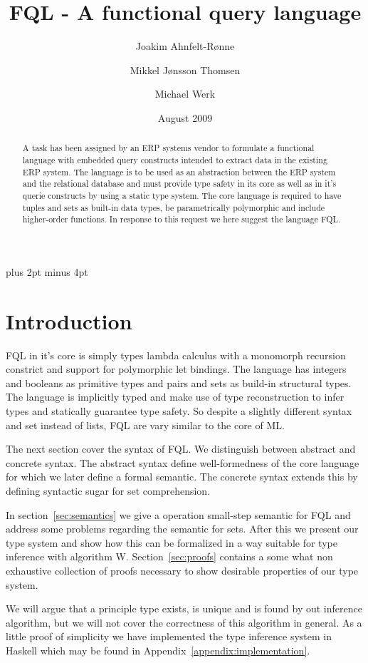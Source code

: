 \documentclass[a4paper]{article}
\title{FQL - A functional query language}
\date{August 2009}
\author{Joakim Ahnfelt-Rønne \and Mikkel Jønsson Thomsen \and Michael Werk}
\begin{document}
\parindent=0pt
\parskip=8pt plus 2pt minus 4pt
\maketitle

\begin{abstract}\noindent
A task has been assigned by an ERP systems vendor to formulate a functional language with embedded query constructs intended to extract data in the existing ERP system. The language is to be used as an abstraction between the ERP system and the relational database and must provide type safety in its core as well as in it's querie constructs by using a static type system. The core language is required to have tuples and sets as built-in data types, be parametrically polymorphic and include higher-order functions. In response to this request we here suggest the language FQL.
\end{abstract}


\section{Introduction}

FQL in it's core is simply types lambda calculus with a monomorph recursion constrict and support for polymorphic let bindings. The language has integers and booleans as primitive types and pairs and sets as build-in structural types. The language is implicitly typed and make use of type reconstruction to infer types and statically guarantee type safety. So despite a slightly different syntax and set instead of lists, FQL are vary similar to the core of ML.

The next section cover the syntax of FQL. We distinguish  between abstract and concrete syntax. The abstract syntax define well-formedness of the core language for which we later define a formal semantic. The concrete syntax extends this by defining syntactic sugar for set comprehension.

In section~\ref{sec:semantics} we give a operation small-step semantic for FQL and address some problems regarding the semantic for sets. After this we present our type system and show how this can be formalized in a way suitable for type inference with algorithm W. Section~\ref{sec:proofs} contains a some what non exhaustive collection of proofs necessary to show desirable properties of our type system.

We will argue that a principle type exists, is unique and is found by out inference algorithm, but we will not cover the correctness of this algorithm in general. As a little proof of simplicity we have implemented the type inference system in Haskell which may be found in Appendix~\ref{appendix:implementation}.
\end{document}
